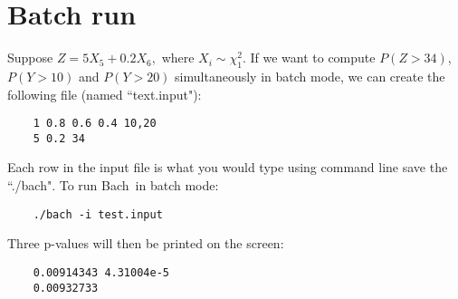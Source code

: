 \documentclass[11pt, Palatino]{article}
\def\bach{{\sc Bach}~}
\begin{document}
\section{Batch run}
Suppose $Z =  5 X_5 + 0.2 X_6,$ where $X_i \sim \chi_1^2$. 
If we want to compute $P(Z>34)$, $P(Y > 10)$ and $P(Y>20)$ simultaneously in batch mode, we can create the following file (named ``text.input"): 
\begin{verbatim}
	1 0.8 0.6 0.4 10,20
	5 0.2 34
\end{verbatim}
Each row in the input file is what you would type using command line save the ``./bach". To run \bach in batch mode: 
\begin{verbatim}
	./bach -i test.input
\end{verbatim}
Three p-values will then be printed on the screen:
\begin{verbatim}
	0.00914343 4.31004e-5
	0.00932733
\end{verbatim}
\end{document}
